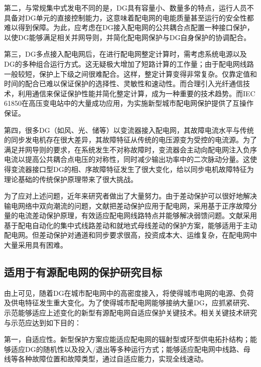 第二，与常规集中式发电不同的是，DG具有容量小、数量多的特点，运行人员不具备对DG单元的直接控制能力，这意味着配电网的电能质量甚至运行的安全性都难以得到保障。为此，应考虑在DG接入配电网的公共耦合点配置一种接口保护，以使DG能够满足相关并网导则，并简化配电网保护与DG自身保护的协调配合。

第三，DG多点接入配电网后，在进行配电网整定计算时，需考虑系统电源以及DG的多种组合运行方式。这无疑极大增加了短路计算的工作量；由于配电网线路一般较短，保护上下级之间很难配合。这样，整定计算变得非常复杂。仅靠定值和时间的配合已难以保证保护的选择性、灵敏性和速动性。而合理引入光纤通信技术，利用通信来保证保护性能并简化整定计算，成为一种重要的技术趋势。而IEC 61850在高压变电站中的大量成功应用，为实施新型城市配电网保护提供了互操作保证。

第四，很多DG（如风、光、储等）以变流器接入配电网，其故障电流水平与传统的同步发电机存在很大差异，其故障特征从传统的电压源变为受控的电流源。为了满足并网导则的要求，在系统发生不对称故障时，变流器会主动向配电网注入负序电流以提高公共耦合点电压的对称性，同时减少输出功率中的二次脉动分量。这使得变流器接口型DG的相、序故障特征发生了很大变化，给以同步电机故障特征为理论基础的传统保护原理带来了很大挑战。

为了应对上述问题，近年来研究者做出了大量努力\cite{ruisheng2015yi,houlei2014,ruisheng2015shi,liukai2014zhu,nikolaidis2016communication,libin2010han,peichao2016zhi}。由于差动保护可以很好地解决输电网络中双向潮流的问题\cite{ruisheng2015yi}，文献\cite{houlei2014}把差动保护应用于配电网，采用基于正序故障分量的电流差动保护原理，有效适应配电网线路特点并能够解决弱馈问题。文献\cite{ruisheng2015shi}采用基于配电自动化的集中式线路差动和就地式母线差动的保护方案，能够适用于主动配电网。但差动保护对通道和同步要求很高\cite{liukai2014zhu}，投资成本大、运维复杂，在配电网中大量采用具有困难。

\subsection{适用于有源配电网的保护研究目标}

由上可见，随着DG在城市配电网中的高密度接入，将使得城市电网的电源、负荷及供电特征发生重大变化。为了使得城市配电网能够接纳大量DG，应抓紧研究、示范能够适应上述变化的新型有源配电网自适应保护关键技术。相关关键技术研究与示范应达到如下目的：

第一，自适应性。新型保护方案应能适应配电网的辐射型或环型供电拓扑结构；能够适应DG的随机性以及投入/退出等多种运行方式；能够适应配电网中线路、母线等各种故障位置和故障类型，通过自适应能力，实现全线速动。

